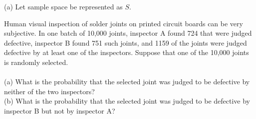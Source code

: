 \documentclass[12pt,letterpaper]{hmcpset}
\begin{document}
\begin{solution}
(a) Let sample space be represented as $S$.

\end{solution}
\newpage

\begin{problem}[2.2.19]
Human visual inspection of solder joints on printed circuit boards can be very subjective. In one batch of 10,000 joints, inspector A found 724 that were judged defective, inspector B found 751 such joints, and 1159 of the joints were judged defective by at least one of the inspectors. Suppose that one of the 10,000 joints is randomly selected.
\\ \\
(a) What is the probability that the selected joint was judged to be defective by neither of the two inspectors?
\\
(b) What is the probability that the selected joint was judged to be defective by inspector B but not by inspector A?


\end{problem}
\end{document}
